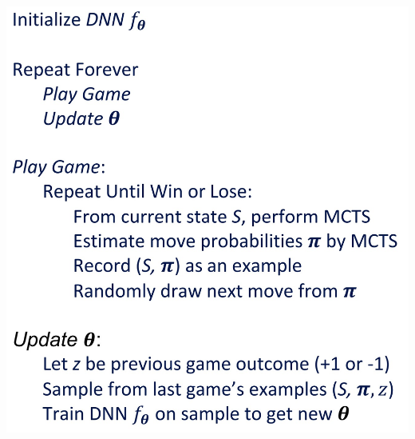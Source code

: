 \documentclass[10pt,landscape]{article}
\begin{document}
\begin{multicols}{4}
    \includegraphics[width=0.7\linewidth]{snips/33_alpha-zero.jpg}
    
\end{multicols}
\end{document}
